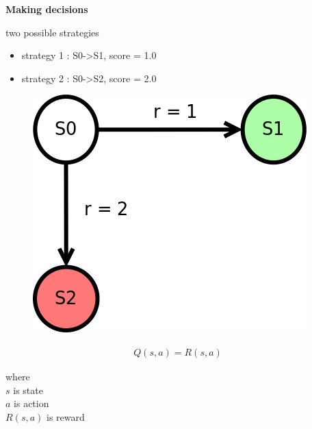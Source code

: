 \documentclass[xcolor=dvipsnames]{beamer}
\begin{document}
\begin{frame}{\bf Making decisions}

two possible strategies
\begin{itemize}
  \item strategy 1 : S0->S1, score = 1.0
  \item strategy 2 : S0->S2, score = 2.0
\end{itemize}

  \begin{figure}
    \includegraphics[scale=0.4]{../../diagrams/rl_trivial.png}
  \end{figure}

\begin{align*}
  Q(s, a) = R(s, a)
\end{align*}

where \\
  $s$ is state \\
  $a$ is action \\
  $R(s, a)$ is reward \\

\end{frame}
\end{document}

